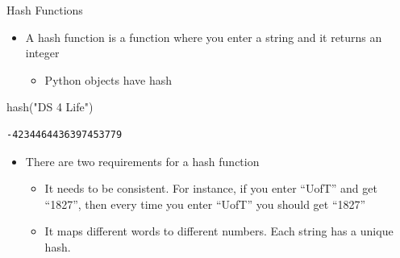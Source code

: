 \documentclass[
  ignorenonframetext,
]{beamer}
\newenvironment{Shaded}{\begin{snugshade}}{\end{snugshade}}
\newcommand{\BuiltInTok}[1]{\textcolor[rgb]{0.00,0.23,0.31}{#1}}
\newcommand{\NormalTok}[1]{\textcolor[rgb]{0.00,0.23,0.31}{#1}}
\newcommand{\StringTok}[1]{\textcolor[rgb]{0.13,0.47,0.30}{#1}}
\providecommand{\tightlist}{%
  \setlength{\itemsep}{0pt}\setlength{\parskip}{0pt}}\usepackage{longtable,booktabs,array}
\begin{document}
\begin{frame}[fragile]{Hash Functions}
\protect\hypertarget{hash-functions}{}
\begin{itemize}
\item
  A hash function is a function where you enter a string and it returns
  an integer

  \begin{itemize}
  \tightlist
  \item
    Python objects have hash
  \end{itemize}
\end{itemize}

\begin{Shaded}
\begin{Highlighting}[]
\BuiltInTok{hash}\NormalTok{(}\StringTok{"DS 4 Life"}\NormalTok{)}
\end{Highlighting}
\end{Shaded}

\begin{verbatim}
-4234464436397453779
\end{verbatim}

\begin{itemize}
\item
  There are two requirements for a hash function

  \begin{itemize}
  \item
    It needs to be consistent. For instance, if you enter ``UofT'' and
    get ``1827'', then every time you enter ``UofT'' you should get
    ``1827''
  \item
    It maps different words to different numbers. Each string has a
    unique hash.
  \end{itemize}
\end{itemize}
\end{frame}
\end{document}
